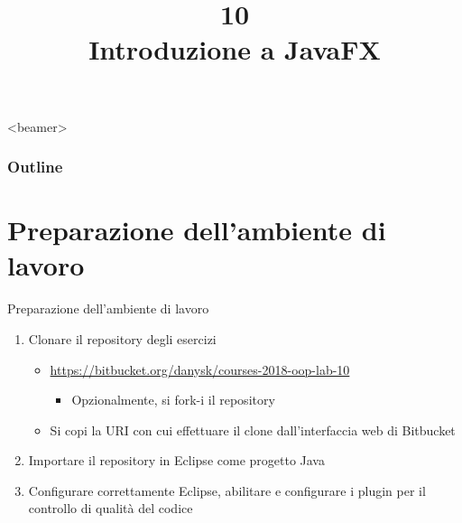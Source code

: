 \documentclass[presentation]{beamer}
\title[L10 -- JavaFX]{10\\Introduzione a JavaFX}
\begin{document}
\frame[label=coverpage]{\titlepage}

\begin{frame}<beamer>
 	\frametitle{Outline}
 	\tableofcontents[]
\end{frame}

\section{Preparazione dell'ambiente di lavoro}

\begin{frame}{Preparazione dell'ambiente di lavoro}
	\begin{enumerate}\itemsep20pt
		\item Clonare il repository degli esercizi
		\begin{itemize}
			\item \url{https://bitbucket.org/danysk/courses-2018-oop-lab-10}
		\begin{itemize}
		\item Opzionalmente, si fork-i il repository
		\end{itemize}
			\item Si copi la URI con cui effettuare il clone dall'interfaccia web di Bitbucket
		\end{itemize}
		\item Importare il repository in Eclipse come progetto Java
		\item Configurare correttamente Eclipse, abilitare e configurare i plugin per il controllo di qualità del codice
	\end{enumerate}
\end{frame}
\end{document}
